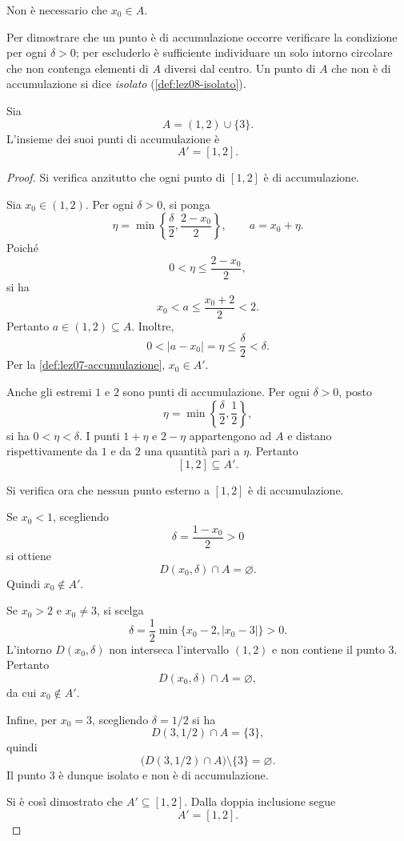 Non è necessario che \(x_0\in A\).

Per dimostrare che un punto è di accumulazione
occorre verificare la condizione per ogni
\(\delta>0\); per escluderlo è sufficiente
individuare un solo intorno circolare che non
contenga elementi di \(A\) diversi dal centro.
Un punto di \(A\) che non è di accumulazione
si dice \emph{isolato} (\cref{def:lez08-isolato}).

\begin{example}
\label{ex:lez07-accumulazione-intervallo}
Sia
\[
  A=(1,2)\cup\{3\}.
\]
L'insieme dei suoi punti di accumulazione è
\[
  A'=[1,2].
\]
\end{example}

\begin{proof}
Si verifica anzitutto che ogni punto di
\([1,2]\) è di accumulazione.

Sia \(x_0\in(1,2)\). Per ogni \(\delta>0\),
si ponga
\[
  \eta=
  \min\left\{
    \frac{\delta}{2},
    \frac{2-x_0}{2}
  \right\},
  \qquad
  a=x_0+\eta.
\]
Poiché
\[
  0<\eta\le\frac{2-x_0}{2},
\]
si ha
\[
  x_0<a\le\frac{x_0+2}{2}<2.
\]
Pertanto \(a\in(1,2)\subseteq A\). Inoltre,
\[
  0<|a-x_0|=\eta
  \le\frac{\delta}{2}<\delta.
\]
Per la \cref{def:lez07-accumulazione},
\(x_0\in A'\).

Anche gli estremi \(1\) e \(2\) sono punti
di accumulazione. Per ogni \(\delta>0\),
posto
\[
  \eta=\min\left\{\frac{\delta}{2},
                  \frac12\right\},
\]
si ha \(0<\eta<\delta\). I punti
\(1+\eta\) e \(2-\eta\) appartengono
ad \(A\) e distano rispettivamente da
\(1\) e da \(2\) una quantità pari a \(\eta\).
Pertanto
\[
  [1,2]\subseteq A'.
\]

Si verifica ora che nessun punto esterno
a \([1,2]\) è di accumulazione.

Se \(x_0<1\), scegliendo
\[
  \delta=\frac{1-x_0}{2}>0
\]
si ottiene
\[
  D(x_0,\delta)\cap A=\varnothing.
\]
Quindi \(x_0\notin A'\).

Se \(x_0>2\) e \(x_0\ne3\), si scelga
\[
  \delta=
  \frac12\min\{x_0-2,|x_0-3|\}>0.
\]
L'intorno \(D(x_0,\delta)\) non interseca
l'intervallo \((1,2)\) e non contiene
il punto \(3\). Pertanto
\[
  D(x_0,\delta)\cap A=\varnothing,
\]
da cui \(x_0\notin A'\).

Infine, per \(x_0=3\), scegliendo
\(\delta=1/2\) si ha
\[
  D(3,1/2)\cap A=\{3\},
\]
quindi
\[
  \bigl(D(3,1/2)\cap A\bigr)
  \setminus\{3\}=\varnothing.
\]
Il punto \(3\) è dunque isolato e non
è di accumulazione.

Si è così dimostrato che
\(A'\subseteq[1,2]\). Dalla doppia
inclusione segue
\[
  A'=[1,2].
\]
\end{proof}


